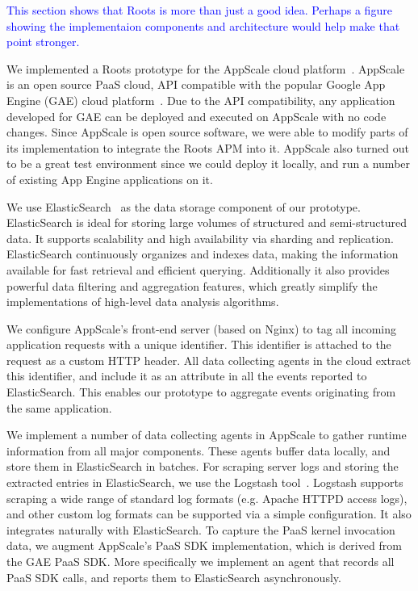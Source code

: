\textcolor{blue}{This section shows that Roots is more than just a good idea.
Perhaps a figure showing the implementaion components and architecture would
help make that point stronger.}

We implemented a Roots prototype for the AppScale cloud
platform~\cite{6488671}. AppScale is an open source PaaS cloud, API compatible
with the popular Google App Engine (GAE) cloud platform~\cite{gae}.  Due to
the API compatibility, any application developed for GAE can be deployed and
executed on AppScale with no code changes. Since AppScale is open source
software, we were able to modify parts of its implementation to integrate the
Roots APM into it. AppScale also turned out to be a great test environment
since we could deploy it locally, and run a number of existing App Engine
applications on it.

We use ElasticSearch~\cite{elasticsearch} as the data storage component of our prototype. ElasticSearch is ideal 
for storing large volumes of structured and semi-structured data. It supports scalability and 
high availability via sharding and replication.
ElasticSearch continuously organizes and indexes data, making the information available 
for fast retrieval and efficient querying. Additionally it also provides
powerful data filtering and aggregation features, which greatly simplify the implementations of high-level
data analysis algorithms.

We configure AppScale's front-end server (based on Nginx) to tag all incoming application requests
with a unique identifier. This identifier is attached to the request as a custom HTTP header.
All data collecting agents in the cloud extract this identifier, and include it as an attribute
in all the events reported to ElasticSearch. This enables our prototype to aggregate events originating
from the same application.

We implement a number of data collecting agents in AppScale to gather runtime information
from all major components. These agents buffer data locally, and store them in ElasticSearch
in batches. For scraping server logs and storing the extracted entries in ElasticSearch,
we use the Logstash tool~\cite{logstash}. Logstash supports scraping a wide range of standard log formats (e.g. 
Apache HTTPD access logs), and other custom log formats can be supported via a simple configuration.
It also integrates naturally with ElasticSearch.
To capture the PaaS kernel invocation data, we augment AppScale's PaaS SDK implementation,
which is derived from the GAE PaaS SDK. More specifically we implement an agent that records
all PaaS SDK calls, and reports them to ElasticSearch asynchronously. 

